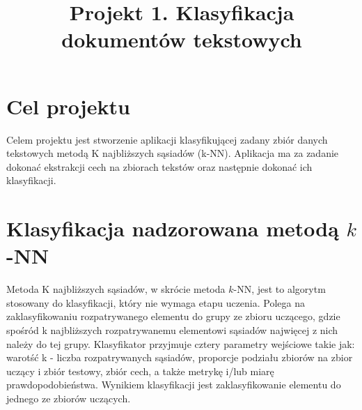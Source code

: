 \documentclass{classrep}
\author{
  \studentinfo{Julia Szymańska}{224441} \and
  \studentinfo{Przemysław Zdrzalik}{224466} }
\title{Projekt 1. Klasyfikacja dokumentów tekstowych}
\begin{document}
\maketitle


\section{Cel projektu}
Celem projektu jest stworzenie aplikacji klasyfikującej zadany zbiór danych tekstowych metodą K najbliższych sąsiadów (k-NN). Aplikacja ma za zadanie dokonać ekstrakcji cech na zbiorach tekstów\cite{dane} oraz następnie dokonać ich klasyfikacji.\\


\section{Klasyfikacja nadzorowana metodą $k$-NN}


Metoda K najbliższych sąsiadów, w skrócie metoda $k$-NN\cite{dane}, jest to algorytm stosowany do klasyfikacji, który nie wymaga etapu uczenia. 
Polega na zaklasyfikowaniu rozpatrywanego elementu do grupy ze zbioru uczącego, gdzie spośród k najbliższych rozpatrywanemu elementowi sąsiadów najwięcej z nich należy do tej grupy. Klasyfikator przyjmuje cztery parametry wejściowe takie jak: warotść k - liczba rozpatrywanych sąsiadów, proporcje podziału zbiorów na zbior uczący i zbiór testowy, zbiór cech, a także metrykę i/lub miarę prawdopodobieństwa. Wynikiem klasyfikacji jest zaklasyfikowanie elementu do jednego ze zbiorów uczących. 
\end{document}
